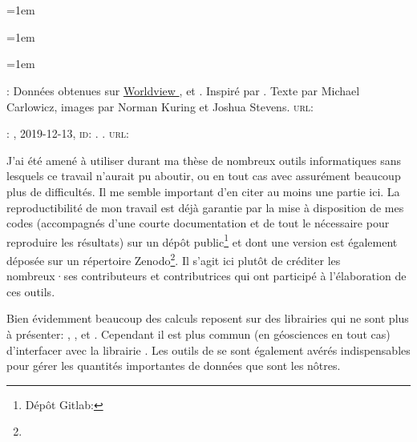 
\chapter*{\bibname}
\mtcaddchapter[\bibname]
\markboth{\bibname}{}
\label{bib}

{
  \nocite{quenouille_1966}
  \emergencystretch=1em
  \printbibliography[heading=none, filter=normal]
}

\unsection{\bibdataTitle}
\label{bib:data}

{
  \emergencystretch=1em
  \printbibliography[heading=none, type=dataset]
}

\label{bib:illustration}

{
  \setlength{\parindent}{0pt}
  \emergencystretch=1em

  : Données obtenues sur \href{https://worldview.earthdata.nasa.gov}{Worldview },  et .
  Inspiré par .
  Texte par Michael Carlowicz, images par Norman Kuring et Joshua Stevens.
  \textsc{url:} 

  \medskip

  : , 2019-12-13, \textsc{id}: .
  .
  \textsc{url:} 
}

\unsection{\bibsoftwareTitle}
\label{bib:software}

J'ai été amené à utiliser durant ma thèse de nombreux outils informatiques sans lesquels ce travail n'aurait pu aboutir, ou en tout cas avec assurément beaucoup plus de difficultés.
Il me semble important d'en citer au moins une partie ici.
La reproductibilité de mon travail est déjà garantie par la mise à disposition de mes codes (accompagnés d'une courte documentation et de tout le nécessaire pour reproduire les résultats) sur un dépôt public\footnote{%
  Dépôt Gitlab: }
et dont une version est également déposée sur un répertoire Zenodo\footnote{}.
Il s'agit ici plutôt de créditer les nombreux·ses contributeurs et contributrices qui ont participé à l'élaboration de ces outils.

Bien évidemment beaucoup des calculs reposent sur des librairies qui ne sont plus à présenter: , , et .
Cependant il est plus commun (en géosciences en tout cas) d'interfacer avec la librairie .
Les outils de  se sont également avérés indispensables pour gérer les quantités importantes de données que sont les nôtres.

